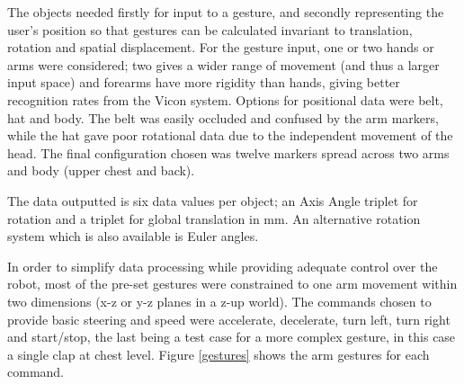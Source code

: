 \documentclass[12pt,a4,notitlepage]{report}
\renewcommand{\_}{\texttt{\symbol{95}}}
\newcommand{\<}{\texttt{\symbol{60}}}
\renewcommand{\>}{\texttt{\symbol{62}}}
\begin{document}
The objects needed firstly for input to a gesture, and secondly representing the user's position so that gestures can be calculated invariant to translation, rotation and spatial displacement. For the gesture input, one or two hands or arms were considered; two gives a wider range of movement (and thus a larger input space) and forearms have more rigidity than hands, giving better recognition rates from the Vicon system. Options for positional data were belt, hat and body. The belt was easily occluded and confused by the arm markers, while the hat gave poor rotational data due to the independent movement of the head. The final configuration chosen was twelve markers spread across two arms and body (upper chest and back).

The data outputted is six data values per object; an Axis Angle triplet for rotation and a triplet for global translation in mm. An alternative rotation system which is also available is Euler angles.

In order to simplify data processing while providing adequate control over the robot, most of the pre-set gestures were constrained to one arm movement within two dimensions (x-z or y-z planes in a z-up world). The commands chosen to provide basic steering and speed were accelerate, decelerate, turn left, turn right and start/stop, the last being a test case for a more complex gesture, in this case a single clap at chest level. Figure \ref{gestures} shows the arm gestures for each command.
\end{document}
